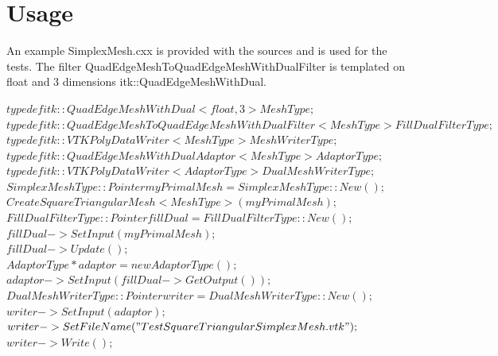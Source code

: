\documentclass{InsightArticle}
\begin{document}
\section{Usage}

An example SimplexMesh.cxx is provided with the sources and is used for the tests. The filter QuadEdgeMeshToQuadEdgeMeshWithDualFilter is templated on float and 3 dimensions itk::QuadEdgeMeshWithDual. 

  $typedef itk::QuadEdgeMeshWithDual< float, 3 > MeshType;$ \\

  $typedef itk::QuadEdgeMeshToQuadEdgeMeshWithDualFilter< MeshType >  FillDualFilterType; $\\

  $typedef itk::VTKPolyDataWriter< MeshType > MeshWriterType;$\\
  $typedef itk::QuadEdgeMeshWithDualAdaptor< MeshType >  AdaptorType;$\\
  $typedef itk::VTKPolyDataWriter< AdaptorType > DualMeshWriterType;$\\

  $SimplexMeshType::Pointer myPrimalMesh = SimplexMeshType::New();$\\
  $CreateSquareTriangularMesh< MeshType >( myPrimalMesh );$\\

  $FillDualFilterType::Pointer fillDual = FillDualFilterType::New();$\\
  $fillDual->SetInput( myPrimalMesh );$\\
  $fillDual->Update( );$\\

  $AdaptorType* adaptor = new AdaptorType();$\\
  $adaptor->SetInput( fillDual->GetOutput() );$\\

  $DualMeshWriterType::Pointer writer = DualMeshWriterType::New();$\\
  $writer->SetInput( adaptor );$\\
  $writer->SetFileName( "TestSquareTriangularSimplexMesh.vtk" );$\\
  $writer->Write();$\\
 


%
%



\end{document}
